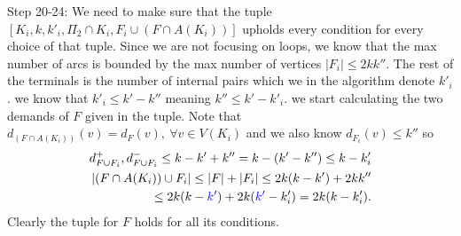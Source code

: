     Step 20-24: We need to make sure that the tuple $[K_i,k,k'_i,\Pi_2 \cap K_i,F_i\cup(F\cap A(K_i))]$ upholds every condition for every choice of that tuple. 
    Since we are not focusing on loops, we know that the max number of arcs is bounded by the max number of vertices $|F_i|\leq 2kk''$. The rest of the terminals is the number of internal pairs which we in the algorithm denote $k'_i$. we know that $k'_i\leq k'-k''$ meaning $k''\leq k'-k'_i$.
    we start calculating the two demands of $F$ given in the tuple.
    Note that $d_{(F\cap A(K_i))}(v)=d_{F}(v), \ \forall v\in V(K_i)$ and we also know $d_{F_i}(v)\leq k''$ so
    \begin{align}
        d^+_{F\cup F_i},d^-_{F\cup F_i}\leq k-k' + k'' = k-(k'-k'')\leq k- k'_i \\
        |(F \cap A(K_i))\cup F_i|\leq |F|+|F_i|\leq 2k(k-k') +2kk''\\
        \leq 2k(k-\textcolor{blue}{k'})+2k(\textcolor{blue}{k'}-k'_i)=2k(k-k'_i).
    \end{align}
    Clearly the tuple for $F$ holds for all its conditions.

